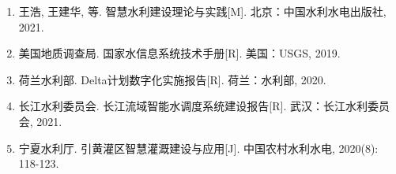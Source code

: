 \begin{enumerate}
\def\labelenumi{\arabic{enumi}.}
\tightlist
\item
  王浩, 王建华, 等. 智慧水利建设理论与实践{[}M{]}.
  北京：中国水利水电出版社, 2021.
\item
  美国地质调查局. 国家水信息系统技术手册{[}R{]}. 美国：USGS, 2019.
\item
  荷兰水利部. Delta计划数字化实施报告{[}R{]}. 荷兰：水利部, 2020.
\item
  长江水利委员会. 长江流域智能水调度系统建设报告{[}R{]}.
  武汉：长江水利委员会, 2021.
\item
  宁夏水利厅. 引黄灌区智慧灌溉建设与应用{[}J{]}. 中国农村水利水电,
  2020(8): 118-123.
\end{enumerate}
